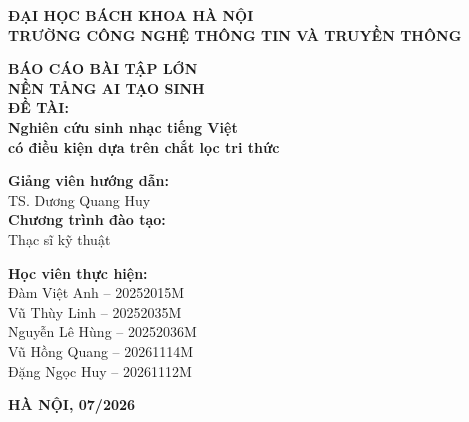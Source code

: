 \documentclass[a4paper,13pt,oneside]{report}
\begin{document}
\hypersetup{pageanchor=false}

\begin{titlepage}
\thispagestyle{empty}
\begin{center}

{\textbf{\large{ĐẠI HỌC BÁCH KHOA HÀ NỘI}}}\\[0.2cm]
{\textbf{\large{TRƯỜNG CÔNG NGHỆ THÔNG TIN VÀ TRUYỀN THÔNG}}}\\[0.5cm]
\vfill

{\textbf{\huge{BÁO CÁO BÀI TẬP LỚN}}}\\[0.3cm]
{\textbf{\Large{NỀN TẢNG AI TẠO SINH}}}\\[1cm]

{\textbf{\Large{ĐỀ TÀI:}}}\\[0.2cm]
{\textbf{\Large{Nghiên cứu sinh nhạc tiếng Việt\\ có điều kiện dựa trên chắt lọc tri thức}}}\\[1.5cm]

\end{center}

\vfill

\noindent
\begin{minipage}[t]{0.45\textwidth}
    \textbf{Giảng viên hướng dẫn:}\\
    TS. Dương Quang Huy\\[1cm]
    \textbf{Chương trình đào tạo:}\\
    Thạc sĩ kỹ thuật
\end{minipage}
\hfill
\begin{minipage}[t]{0.5\textwidth}
    \raggedleft
    \textbf{Học viên thực hiện:}\\
    Đàm Việt Anh -- 20252015M\\
    Vũ Thùy Linh -- 20252035M\\
    Nguyễn Lê Hùng -- 20252036M\\
    Vũ Hồng Quang -- 20261114M\\
    Đặng Ngọc Huy -- 20261112M
\end{minipage}

\vfill
\vfill

\begin{center}
{\textbf{\large{HÀ NỘI, 07/2026}}}
\end{center}

\end{titlepage}
\end{document}
